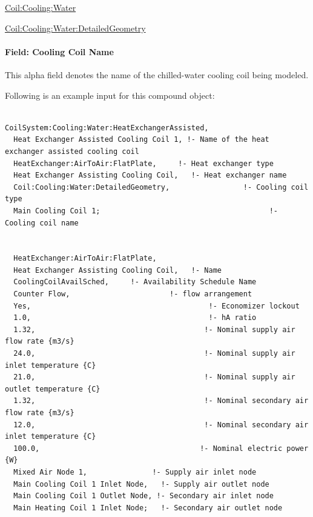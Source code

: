 \hyperref[coilcoolingwater]{Coil:Cooling:Water}

\hyperref[coilcoolingwaterdetailedgeometry]{Coil:Cooling:Water:DetailedGeometry}

\paragraph{Field: Cooling Coil Name}\label{field-cooling-coil-name-2}

This alpha field denotes the name of the chilled-water cooling coil being modeled.

Following is an example input for this compound object:

\begin{lstlisting}

CoilSystem:Cooling:Water:HeatExchangerAssisted,
  Heat Exchanger Assisted Cooling Coil 1, !- Name of the heat exchanger assisted cooling coil
  HeatExchanger:AirToAir:FlatPlate,     !- Heat exchanger type
  Heat Exchanger Assisting Cooling Coil,   !- Heat exchanger name
  Coil:Cooling:Water:DetailedGeometry,                 !- Cooling coil type
  Main Cooling Coil 1;                                       !- Cooling coil name


  HeatExchanger:AirToAir:FlatPlate,
  Heat Exchanger Assisting Cooling Coil,   !- Name
  CoolingCoilAvailSched,     !- Availability Schedule Name
  Counter Flow,                       !- flow arrangement
  Yes,                                         !- Economizer lockout
  1.0,                                         !- hA ratio
  1.32,                                       !- Nominal supply air flow rate {m3/s}
  24.0,                                       !- Nominal supply air inlet temperature {C}
  21.0,                                       !- Nominal supply air outlet temperature {C}
  1.32,                                       !- Nominal secondary air flow rate {m3/s}
  12.0,                                       !- Nominal secondary air inlet temperature {C}
  100.0,                                     !- Nominal electric power {W}
  Mixed Air Node 1,               !- Supply air inlet node
  Main Cooling Coil 1 Inlet Node,   !- Supply air outlet node
  Main Cooling Coil 1 Outlet Node, !- Secondary air inlet node
  Main Heating Coil 1 Inlet Node;   !- Secondary air outlet node





\end{lstlisting}
